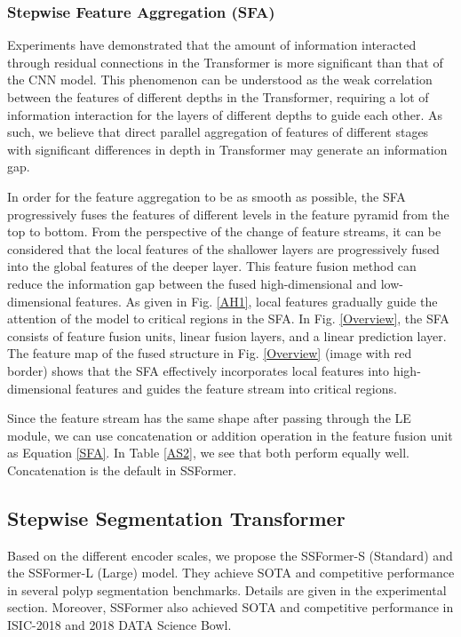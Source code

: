 \documentclass[runningheads]{llncs}
\begin{document}
\subsubsection{Stepwise Feature Aggregation (SFA)}
 Experiments \cite{raghu2021vision} have demonstrated that the amount of information interacted through residual connections \cite{he2016deep} in the Transformer is more significant than that of the CNN model. This phenomenon can be understood as the weak correlation between the features of different depths in the Transformer, requiring a lot of information interaction for the layers of different depths to guide each other. As such, we believe that direct parallel aggregation of features of different stages with significant differences in depth in Transformer may generate an information gap. 

In order for the feature aggregation to be as smooth as possible, the SFA progressively fuses the features of different levels in the feature pyramid from the top to bottom. From the perspective of the change of feature streams, it can be considered that the local features of the shallower layers are progressively fused into the global features of the deeper layer. This feature fusion method can reduce the information gap between the fused high-dimensional and low-dimensional features. 
As given in Fig. \ref{AH1}, local features gradually guide the attention of the model to critical regions in the SFA. In Fig. \ref{Overview}, the SFA consists of feature fusion units, linear fusion layers, and a linear prediction layer. The feature map of the fused structure in Fig. \ref{Overview} (image with red border) shows that the SFA effectively incorporates local features into high-dimensional features and guides the feature stream into critical regions.



Since the feature stream has the same shape after passing through the LE module, we can use concatenation or addition operation in the feature fusion unit as Equation \ref{SFA}. In Table \ref{AS2}, we see that both perform equally well. Concatenation is the default in SSFormer.




\subsection{Stepwise Segmentation Transformer}
Based on the different encoder scales, we propose the SSFormer-S (Standard) and the SSFormer-L (Large) model. They achieve SOTA and competitive performance in several polyp segmentation benchmarks. Details are given in the experimental section. Moreover, SSFormer also achieved SOTA and competitive performance in ISIC-2018 and 2018 DATA Science Bowl. 
\end{document}
